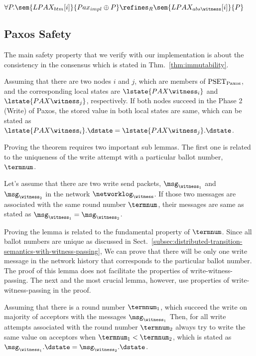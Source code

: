 \begin{theorem}
\label{thm:contextual-refinement-witness}
\noindent$\forall{}P.\sem{LPAX_{btm}[i]}{Pax_{impl} \oplus P} \refines_R \sem{LPAX_{abs\witness}[i]}{P}$
\end{theorem}


\subsection{Paxos Safety}
\label{subsec:paxos-safety}

The main safety property that we verify with our implementation is about the consistency in the consensus which 
is stated in Thm.~\ref{thm:immutability}.

\begin{theorem}[Immutability]
\label{thm:immutability}
Assuming that there are two nodes  $i$ and $j$, which are members of $\mathrm{PSET}_{\mathrm{Paxos}}$,
and the corresponding local states are  $\lstate{PAX\witness_i}$ and 
$\lstate{PAX\witness_j}$, respectively.
If both nodes succeed in the Phase 2 (Write) of Paxos, 
the stored value in both local states are same, which can be stated as\ $\lstate{PAX\witness_i}.\dstate  = \lstate{PAX\witness_j}.\dstate$.
\end{theorem}

Proving the theorem requires two important sub lemmas. 
The first one is related to the uniqueness of the write attempt with a particular ballot number, $\termnum$.

\begin{lemma}
\label{lemma:write-once}
Let's assume that there are two write send packets, $\msg_{\witness_1}$ and $\msg_{\witness_2}$
in the network ${\networklog}_{\witness}$. 
If those two messages are associated with the same round number $\termnum$, 
their messages are same as stated as $\msg_{\witness_1} = \msg_{\witness_2}$.
\end{lemma}

Proving the lemma is related to the fundamental property of $\termnum$.
Since all ballot numbers are unique as discussed in Sect.~\ref{subsec:distributed-transition-semantics-with-witness-passing}, 
We can prove that there will be only one write message in the network history that corresponds to the particular ballot number. 
The proof of this lemma does not facilitate the properties of  write-witness-passing. 
The next and the most crucial lemma, however, use properties of  write-witness-passing in the proof.

\begin{lemma}
\label{lemma:write-lift}
Assuming that there is a round number $\termnum_1$, which succeed the write on majority of acceptors with the messages
$\msg_{\witness_1}$ 
Then, for all write attempts associated with the round number $\termnum_2$ always try to write  
the same value on acceptors when $\termnum_1 < \termnum_2$, which is stated as 
$\msg_{\witness_1}.\dstate = \msg_{\witness_2}.\dstate$.
\end{lemma}

